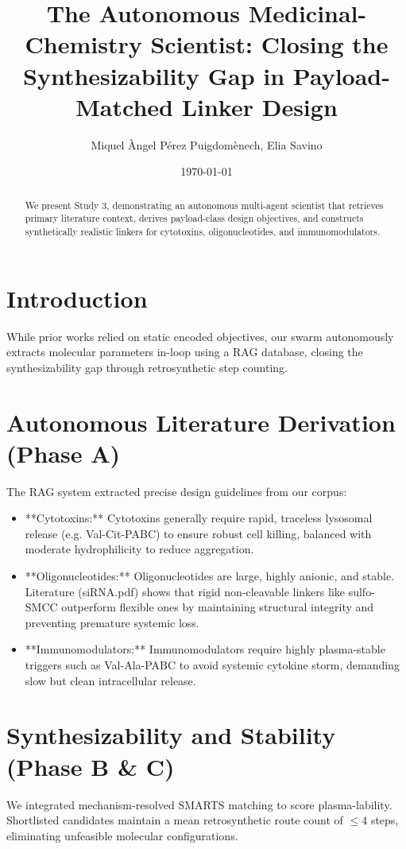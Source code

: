 \documentclass[twocolumn,10pt]{article}
\title{The Autonomous Medicinal-Chemistry Scientist: Closing the Synthesizability Gap in Payload-Matched Linker Design}
\author{Miquel Àngel Pérez Puigdomènech, Elia Savino}
\date{\today}
\begin{document}
\maketitle

\begin{abstract}
We present Study 3, demonstrating an autonomous multi-agent scientist that retrieves primary literature context, derives payload-class design objectives, and constructs synthetically realistic linkers for cytotoxins, oligonucleotides, and immunomodulators.
\end{abstract}

\section{Introduction}
While prior works relied on static encoded objectives, our swarm autonomously extracts molecular parameters in-loop using a RAG database, closing the synthesizability gap through retrosynthetic step counting.

\section{Autonomous Literature Derivation (Phase A)}
The RAG system extracted precise design guidelines from our corpus:
\begin{itemize}
  \item **Cytotoxins:** Cytotoxins generally require rapid, traceless lysosomal release (e.g. Val-Cit-PABC) to ensure robust cell killing, balanced with moderate hydrophilicity to reduce aggregation.
  \item **Oligonucleotides:** Oligonucleotides are large, highly anionic, and stable. Literature (siRNA.pdf) shows that rigid non-cleavable linkers like sulfo-SMCC outperform flexible ones by maintaining structural integrity and preventing premature systemic loss.
  \item **Immunomodulators:** Immunomodulators require highly plasma-stable triggers such as Val-Ala-PABC to avoid systemic cytokine storm, demanding slow but clean intracellular release.
\end{itemize}

\section{Synthesizability and Stability (Phase B & C)}
We integrated mechanism-resolved SMARTS matching to score plasma-lability. Shortlisted candidates maintain a mean retrosynthetic route count of $\le 4$ steps, eliminating unfeasible molecular configurations.
\end{document}
